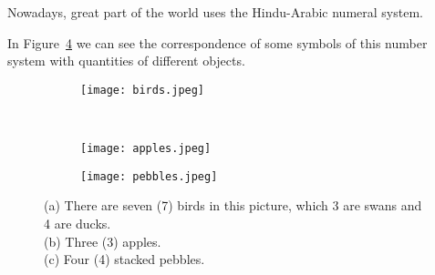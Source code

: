 Nowadays, great part of the world uses the Hindu-Arabic numeral system.

In Figure~\ref{fig:exampleNumbers} we can see the correspondence of some symbols of this number system with quantities of different objects.

\begin{figure}
  \centering
     \begin{subfigure}{.8\textwidth}
         \centering
         \texttt{[image: birds.jpeg]}
         \caption{}
         \label{fig:birds}
     \end{subfigure}\\
     \begin{subfigure}{0.45\textwidth}
         \centering
         \texttt{[image: apples.jpeg]}
         \caption{}
         \label{fig:apples}
     \end{subfigure}
     \begin{subfigure}{0.5\textwidth}
         \centering
         \texttt{[image: pebbles.jpeg]}
         \caption{}
         \label{fig:pebbles}
     \end{subfigure}
     \caption[Correspondence between symbols and object quantities.]{(a) There are seven (7) birds in this picture, which 3 are swans and 4 are ducks. \\(b) Three (3) apples.\\ (c) Four (4) stacked pebbles.}\label{fig:exampleNumbers}
\end{figure}

